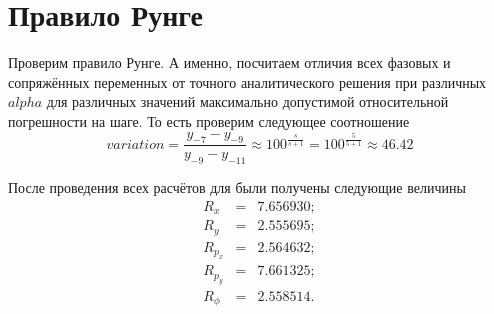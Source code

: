 \section{Правило Рунге}
Проверим правило Рунге. А именно, посчитаем отличия всех фазовых и сопряжённых переменных от точного аналитического решения при различных $alpha$ для различных значений максимально допустимой относительной погрешности на шаге. То есть проверим следующее соотношение
\[
variation = \frac{y_{-7} - y_{-9}}{y_{-9} - y_{-11}} \approx 100^{\frac{s}{s+1}} = 100^{\frac{5}{5+1}} \approx  46.42 
\]

После проведения всех расчётов для были получены следующие величины
\begin{eqnarray}
R_x &=& 7.656930;\\
R_y &=& 2.555695;\\
R_{p_x} &=& 2.564632;\\
R_{p_y} &=& 7.661325;\\
R_{\phi} &=& 2.558514.\\
\end{eqnarray}